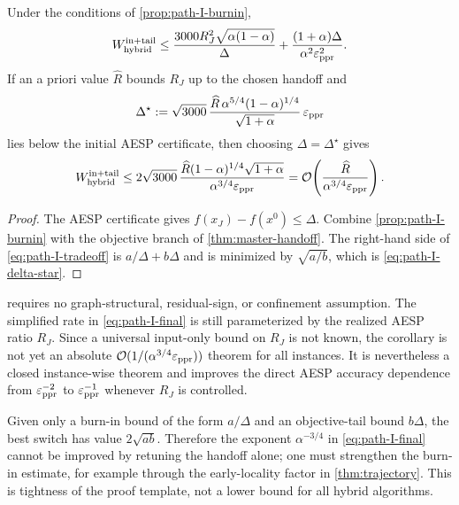 \begin{corollary}
\label{cor:path-I}
Under the conditions of \cref{prop:path-I-burnin},
\begin{equation}
  W_{\rm hybrid}^{\rm in+tail}
  \leq
  \frac{3000R_J^2\sqrt{\alpha(1-\alpha)}}{\Delta}
  +
  \frac{(1+\alpha)\Delta}{\alpha^2\varepsilon_{\mathrm{ppr}}^2}.
  \label{eq:path-I-tradeoff}
\end{equation}
If an a priori value $\widehat R$ bounds $R_J$ up to the chosen handoff and
\begin{equation}
  \Delta^\star
  :=
  \sqrt{3000}\,
  \frac{\widehat R\,\alpha^{5/4}(1-\alpha)^{1/4}}
       {\sqrt{1+\alpha}}\,\varepsilon_{\mathrm{ppr}}
  \label{eq:path-I-delta-star}
\end{equation}
lies below the initial AESP certificate, then choosing
$\Delta=\Delta^\star$ gives
\begin{equation}
  W_{\rm hybrid}^{\rm in+tail}
  \leq
  2\sqrt{3000}\,
  \frac{\widehat R(1-\alpha)^{1/4}\sqrt{1+\alpha}}
       {\alpha^{3/4}\varepsilon_{\mathrm{ppr}}}
  =\mathcal{O}\!\left(\frac{\widehat R}{\alpha^{3/4}\varepsilon_{\mathrm{ppr}}}\right).
  \label{eq:path-I-final}
\end{equation}
\end{corollary}

\begin{proof}
The AESP certificate gives $f(x_J)-f(x^0)\leq\Delta$.  Combine
\cref{prop:path-I-burnin} with the objective branch of
\cref{thm:master-handoff}.  The right-hand side of
\cref{eq:path-I-tradeoff} is $a/\Delta+b\Delta$ and is minimized by
$\sqrt{a/b}$, which is \cref{eq:path-I-delta-star}.
\end{proof}

\begin{remark}
 requires no graph-structural, residual-sign, or
confinement assumption.  The simplified rate in \cref{eq:path-I-final} is
still parameterized by the realized AESP ratio $R_J$.  Since a universal
input-only bound on $R_J$ is not known, the corollary is not yet an absolute
$\mathcal{O}(1/(\alpha^{3/4}\varepsilon_{\mathrm{ppr}}))$ theorem for all instances.  It is nevertheless a
closed instance-wise theorem and improves the direct AESP accuracy dependence
from $\varepsilon_{\mathrm{ppr}}^{-2}$ to $\varepsilon_{\mathrm{ppr}}^{-1}$ whenever $R_J$ is controlled.
\end{remark}

\begin{remark}
Given only a burn-in bound of the form $a/\Delta$ and an objective-tail bound
$b\Delta$, the best switch has value $2\sqrt{ab}$.  Therefore the exponent
$\alpha^{-3/4}$ in \cref{eq:path-I-final} cannot be improved by retuning the
handoff alone; one must strengthen the burn-in estimate, for example through
the early-locality factor in \cref{thm:trajectory}.  This is tightness of the
proof template, not a lower bound for all hybrid algorithms.
\end{remark}

